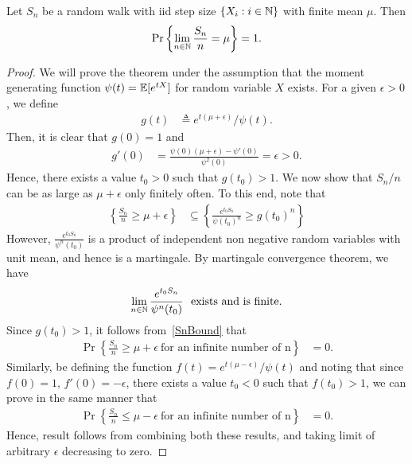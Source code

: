 \documentclass[a4paper,10pt,english]{article}
\begin{document}
\begin{thm} Let $S_n$ be a random walk with iid step size $\{X_i: i \in \mathbb{N}\}$ with finite mean $\mu$. %
Then
\begin{align*}
\Pr\left\{\lim_{n \in \mathbb{N}}\frac{S_n}{n} = \mu\right\} = 1.
\end{align*}
\end{thm}
\begin{proof}
We will prove the theorem under the assumption that the moment generating function $\psi(t)=\mathbb{E}[e^{tX}]$ for random variable $X$ exists. 
For a given $\epsilon>0$, we define
\begin{align*}
g(t) & \triangleq e^{t(\mu+\epsilon)}/\psi(t).
\end{align*}
Then, it is clear that $g(0) = 1$ and 
\begin{align*}
g'(0)& =\frac{ \psi(0)(\mu+\epsilon) -\psi'(0)  }{\psi^2(0)}=\epsilon >0.
\end{align*}
Hence, there exists a value $t_0>0$ such that $g(t_0)>1$. We now show that $S_n/n$ can be as large as $\mu+\epsilon$ only finitely often. 
To this end, note that
\begin{align}
\label{SnBound}
\left\{\frac{S_n}{n} \geq \mu+\epsilon \right\} &\subseteq \left\{ \frac{e^{t_0S_n}}{\psi(t_0)^n} \geq { g(t_0)}^n \right\}
\end{align}
However, $\frac{e^{t_0S_n}}{\psi^n(t_0)}$ is a product of independent non negative random variables with unit mean, and hence is a martingale. 
By martingale convergence theorem, we have 
\begin{align*}
\lim_{n \in \mathbb{N} } \frac{e^{t_0S_n}}{\psi^n(t_0)} ~\text{ exists and is finite}.
\end{align*}
Since $g(t_0) >1$, it follows from~\eqref{SnBound} that
\begin{align*}
\Pr\left\{\frac{S_n}{n} \geq \mu+\epsilon ~\text{for an infinite number of n} \right\} &= 0.
\end{align*}
Similarly, be defining the function $f(t)=e^{t(\mu-\epsilon)}/\psi(t)$ and noting that since $f(0)=1$, $f'(0)=-\epsilon$, there exists a value $t_0<0$ such that $f(t_0)>1$, we can prove in the same manner that
\begin{align*}
\Pr\left\{\frac{S_n}{n} \leq \mu-\epsilon ~\text{for an infinite number of n} \right\} &= 0.
\end{align*}
Hence, result follows from combining both these results, and taking limit of arbitrary $\epsilon$ decreasing to zero.
\end{proof}
\end{document}
